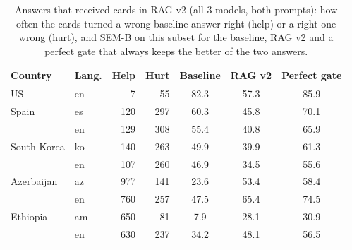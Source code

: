 \documentclass[11pt]{article}
\begin{document}
\begin{table}[h]
\centering
\caption{Answers that received cards in RAG v2 (all 3 models, both prompts): how often the cards turned a
wrong baseline answer right (help) or a right one wrong (hurt), and SEM-B on this subset for the
baseline, RAG v2 and a perfect gate that always keeps the better of the two answers.}
\label{tab:helphurt}
\small
\begin{tabular}{ll|rr|ccc}
\toprule
Country & Lang. & Help & Hurt & Baseline & RAG v2 & Perfect gate \\
\midrule
US          & en & 7   & 55  & 82.3 & 57.3 & 85.9 \\
Spain       & es & 120 & 297 & 60.3 & 45.8 & 70.1 \\
            & en & 129 & 308 & 55.4 & 40.8 & 65.9 \\
South Korea & ko & 140 & 263 & 49.9 & 39.9 & 61.3 \\
            & en & 107 & 260 & 46.9 & 34.5 & 55.6 \\
Azerbaijan  & az & 977 & 141 & 23.6 & 53.4 & 58.4 \\
            & en & 760 & 257 & 47.5 & 65.4 & 74.5 \\
Ethiopia    & am & 650 & 81  & 7.9  & 28.1 & 30.9 \\
            & en & 630 & 237 & 34.2 & 48.1 & 56.5 \\
\bottomrule
\end{tabular}
\end{table}
\end{document}
